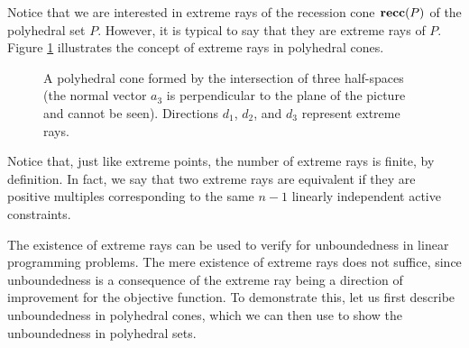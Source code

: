 Notice that we are interested in extreme rays of the recession cone ${\bf recc} (P)$ of the polyhedral set $P$. However, it is typical to say that they are extreme rays of $P$. Figure \ref{p1c6:fig:extreme_rays} illustrates the concept of extreme rays in polyhedral cones.

\begin{figure}
	\caption{A polyhedral cone formed by the intersection of three half-spaces (the normal vector $a_3$ is perpendicular to the plane of the picture and cannot be seen). Directions $d_1$, $d_2$, and $d_3$ represent extreme rays.} \label{p1c6:fig:extreme_rays}	
\end{figure}

Notice that, just like extreme points, the number of extreme rays is finite, by definition. In fact, we say that two extreme rays are equivalent if they are positive multiples corresponding to the same $n-1$ linearly independent active constraints.


The existence of extreme rays can be used to verify for unboundedness in linear programming problems. The mere existence of extreme rays does not suffice, since unboundedness is a consequence of the extreme ray being a direction of improvement for the objective function. To demonstrate this, let us first describe unboundedness in polyhedral cones, which we can then use to show the unboundedness in polyhedral sets.

